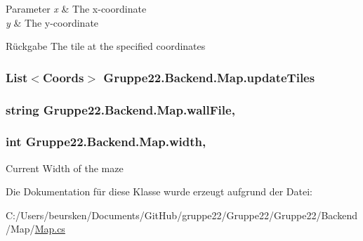 \begin{DoxyParams}{Parameter}
{\em x} & The x-\/coordinate\\
\hline
{\em y} & The y-\/coordinate\\
\hline
\end{DoxyParams}
\begin{DoxyReturn}{Rückgabe}
The tile at the specified coordinates
\end{DoxyReturn}
\hypertarget{class_gruppe22_1_1_backend_1_1_map_a33e42ed0b62ddb58ce402fb6fc455fdb}{
\subsubsection[{update\-Tiles}]{\setlength{\rightskip}{0pt plus 5cm}List$<${\bf Coords}$>$ Gruppe22.\-Backend.\-Map.\-update\-Tiles\hspace{0.3cm}{\ttfamily [get]}}}\label{class_gruppe22_1_1_backend_1_1_map_a33e42ed0b62ddb58ce402fb6fc455fdb}
\hypertarget{class_gruppe22_1_1_backend_1_1_map_ac30d110dd5617ce4ee1f0cab607ea6e8}{
\subsubsection[{wall\-File}]{\setlength{\rightskip}{0pt plus 5cm}string Gruppe22.\-Backend.\-Map.\-wall\-File\hspace{0.3cm}{\ttfamily [get]}, {\ttfamily [set]}}}\label{class_gruppe22_1_1_backend_1_1_map_ac30d110dd5617ce4ee1f0cab607ea6e8}
\hypertarget{class_gruppe22_1_1_backend_1_1_map_ae185d7c51dd35311f6065044e603e81f}{
\subsubsection[{width}]{\setlength{\rightskip}{0pt plus 5cm}int Gruppe22.\-Backend.\-Map.\-width\hspace{0.3cm}{\ttfamily [get]}, {\ttfamily [set]}}}\label{class_gruppe22_1_1_backend_1_1_map_ae185d7c51dd35311f6065044e603e81f}


Current Width of the maze 



Die Dokumentation für diese Klasse wurde erzeugt aufgrund der Datei\-:\begin{DoxyCompactItemize}
\item 
C\-:/\-Users/beursken/\-Documents/\-Git\-Hub/gruppe22/\-Gruppe22/\-Gruppe22/\-Backend/\-Map/\hyperlink{_map_8cs}{Map.\-cs}\end{DoxyCompactItemize}
